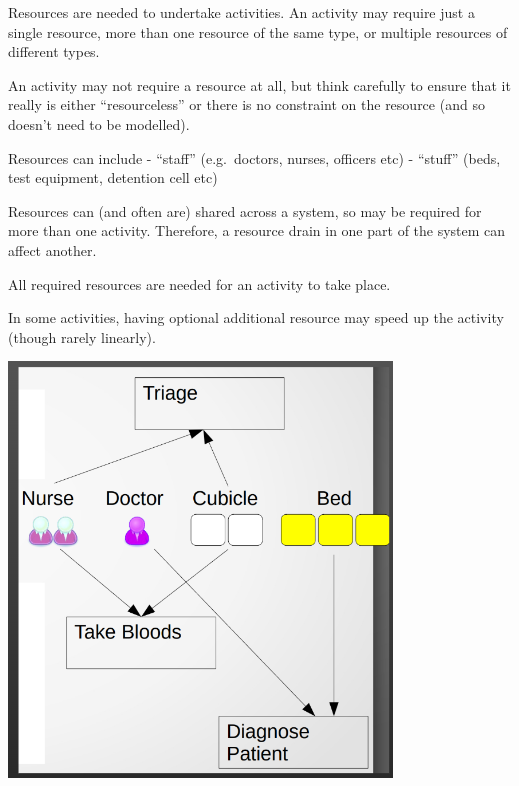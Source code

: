 \documentclass[
  letterpaper,
  DIV=11,
  numbers=noendperiod]{scrreprt}
\begin{document}
Resources are needed to undertake activities. An activity may require
just a single resource, more than one resource of the same type, or
multiple resources of different types.

\begin{tcolorbox}[enhanced jigsaw, colframe=quarto-callout-tip-color-frame, bottomtitle=1mm, breakable, rightrule=.15mm, coltitle=black, colbacktitle=quarto-callout-tip-color!10!white, opacityback=0, leftrule=.75mm, arc=.35mm, toptitle=1mm, title=\textcolor{quarto-callout-tip-color}{\faLightbulb}\hspace{0.5em}{Tip}, titlerule=0mm, colback=white, toprule=.15mm, bottomrule=.15mm, left=2mm, opacitybacktitle=0.6]

An activity may not require a resource at all, but think carefully to
ensure that it really is either ``resourceless'' or there is no
constraint on the resource (and so doesn't need to be modelled).

Resources can include - ``staff'' (e.g.~doctors, nurses, officers etc) -
``stuff'' (beds, test equipment, detention cell etc)

\end{tcolorbox}

Resources can (and often are) shared across a system, so may be required
for more than one activity. Therefore, a resource drain in one part of
the system can affect another.

All required resources are needed for an activity to take place.

In some activities, having optional additional resource may speed up the
activity (though rarely linearly).

\includegraphics{images/resources_simple.png}
\end{document}
